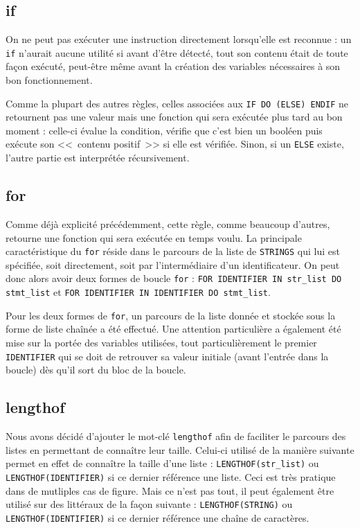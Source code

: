 \documentclass[12pt,twocolumn]{article}
\begin{document}
\subsection{if}
On ne peut pas exécuter une instruction directement lorsqu'elle est reconnue :
un \texttt{if} n'aurait aucune utilité si avant d'être détecté, tout son contenu
était de toute façon exécuté, peut-être même avant la création des variables
nécessaires à son bon fonctionnement.

Comme la plupart des autres règles, celles associées aux
\texttt{IF DO (ELSE) ENDIF} ne retournent pas une valeur mais une fonction
qui sera exécutée plus tard au bon moment : celle-ci évalue la condition,
vérifie que c'est bien un booléen puis exécute son <<~contenu positif~>>
si elle est vérifiée. Sinon, si un \texttt{ELSE} existe, l'autre partie est
interprétée récursivement.


\subsection{for}
Comme déjà explicité précédemment, cette règle, comme beaucoup d'autres,
retourne une fonction qui sera exécutée en temps voulu. La principale
caractéristique du \texttt{for} réside dans le parcours de la liste de
\texttt{STRINGS} qui lui est spécifiée, soit directement, soit par
l'intermédiaire d'un identificateur. On peut donc alors avoir deux formes de
boucle \texttt{for} : \texttt{FOR IDENTIFIER IN str\_list DO stmt\_list} et
\texttt{FOR IDENTIFIER IN IDENTIFIER DO stmt\_list}.

Pour les deux formes de \texttt{for}, un parcours de la liste donnée et stockée
sous la forme de liste chaînée a été effectué. Une attention particulière a
également été mise sur la portée des variables utilisées, tout particulièrement
le premier \texttt{IDENTIFIER} qui se doit de retrouver sa valeur initiale
(avant l'entrée dans la boucle) dès qu'il sort du bloc de la boucle. 

\subsection{lengthof}
Nous avons décidé d'ajouter le mot-clé \texttt{lengthof} afin de faciliter le
parcours des listes en permettant de connaître leur taille. Celui-ci utilisé de
la manière suivante permet en effet de connaître la taille d'une liste :
\texttt{LENGTHOF(str\_list)} ou \texttt{LENGTHOF(IDENTIFIER)} si ce dernier
référence une liste. Ceci est très pratique dans de mutliples cas de figure.
Mais ce n'est pas tout, il peut également être utilisé sur des littéraux de la
façon suivante : \texttt{LENGTHOF(STRING)} ou \texttt{LENGTHOF(IDENTIFIER)} si ce
dernier référence une chaîne de caractères.
\end{document}
